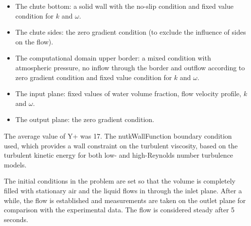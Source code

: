 \documentclass[applsci,article,submit,moreauthors,pdftex]{Definitions/mdpi}
\begin{document}
\begin{itemize}

    \item The chute bottom: a solid wall with the no-slip condition and fixed value condition for $k$ and $\omega$.
    
    \item The chute sides: the zero gradient condition (to exclude the influence of sides on the flow).
    
    \item The computational domain upper border: a mixed condition with atmospheric pressure, no inflow through the border and outflow according to zero gradient condition and fixed value condition for $k$ and $\omega$.
    
    \item The input plane: fixed values of water volume fraction, flow velocity profile, $k$ and $\omega$.
    
    \item The output plane: the zero gradient condition.
    
\end{itemize}

The average value of Y+ was 17. The nutkWallFunction boundary condition used, which provides a wall constraint on the turbulent viscosity, based on the turbulent kinetic energy for both low- and high-Reynolds number turbulence models.


The initial conditions in the problem are set so that the volume is completely filled with stationary air and the liquid flows in through the inlet plane. After a while, the flow is established and measurements are taken on the outlet plane for comparison with the experimental data. The flow is considered steady after 5 seconds.




\end{document}
